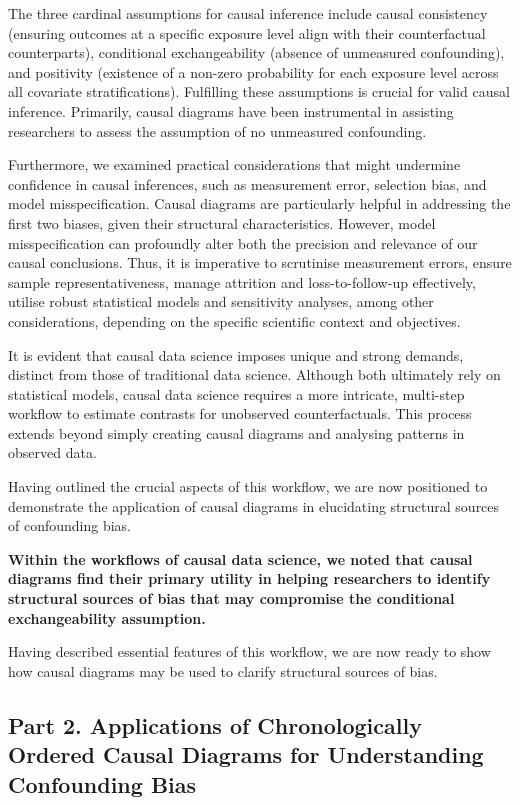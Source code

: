 \documentclass[
  singlecolumn,
  9pt]{article}
\begin{document}
The three cardinal assumptions for causal inference include causal
consistency (ensuring outcomes at a specific exposure level align with
their counterfactual counterparts), conditional exchangeability (absence
of unmeasured confounding), and positivity (existence of a non-zero
probability for each exposure level across all covariate
stratifications). Fulfilling these assumptions is crucial for valid
causal inference. Primarily, causal diagrams have been instrumental in
assisting researchers to assess the assumption of no unmeasured
confounding.

Furthermore, we examined practical considerations that might undermine
confidence in causal inferences, such as measurement error, selection
bias, and model misspecification. Causal diagrams are particularly
helpful in addressing the first two biases, given their structural
characteristics. However, model misspecification can profoundly alter
both the precision and relevance of our causal conclusions. Thus, it is
imperative to scrutinise measurement errors, ensure sample
representativeness, manage attrition and loss-to-follow-up effectively,
utilise robust statistical models and sensitivity analyses, among other
considerations, depending on the specific scientific context and
objectives.

It is evident that causal data science imposes unique and strong
demands, distinct from those of traditional data science. Although both
ultimately rely on statistical models, causal data science requires a
more intricate, multi-step workflow to estimate contrasts for unobserved
counterfactuals. This process extends beyond simply creating causal
diagrams and analysing patterns in observed data.

Having outlined the crucial aspects of this workflow, we are now
positioned to demonstrate the application of causal diagrams in
elucidating structural sources of confounding bias.

\textbf{Within the workflows of causal data science, we noted that
causal diagrams find their primary utility in helping researchers to
identify structural sources of bias that may compromise the conditional
exchangeability assumption.}

Having described essential features of this workflow, we are now ready
to show how causal diagrams may be used to clarify structural sources of
bias.

\subsection{Part 2. Applications of Chronologically Ordered Causal
Diagrams for Understanding Confounding
Bias}\label{part-2.-applications-of-chronologically-ordered-causal-diagrams-for-understanding-confounding-bias}
\end{document}
